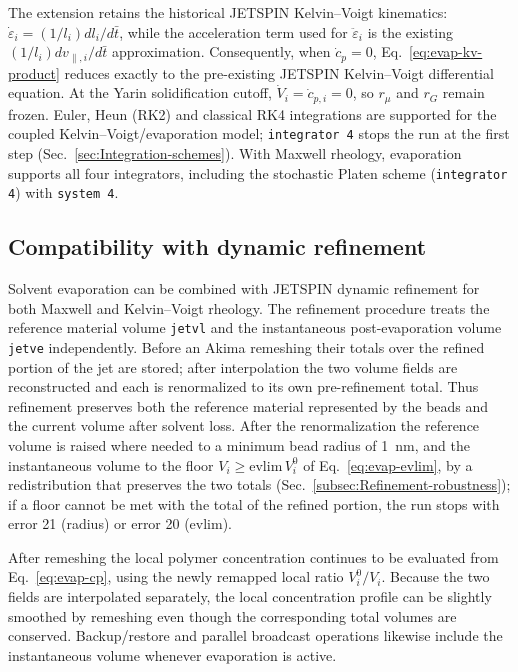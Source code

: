 The extension retains the historical JETSPIN Kelvin--Voigt kinematics:
$\dot\varepsilon_i=(1/l_i)dl_i/d\bar t$, while the acceleration term
used for $\ddot\varepsilon_i$ is the existing
$(1/l_i)d v_{\parallel,i}/d\bar t$ approximation.  Consequently, when
$\dot c_p=0$, Eq.~\ref{eq:evap-kv-product} reduces exactly to the
pre-existing JETSPIN Kelvin--Voigt differential equation.  At the Yarin
solidification cutoff, $\dot V_i=\dot c_{p,i}=0$, so $r_\mu$ and $r_G$
remain frozen.  Euler, Heun (RK2) and classical RK4 integrations are
supported for the coupled Kelvin--Voigt/evaporation model; \texttt{integrator 4}
stops the run at the first step (Sec.~\ref{sec:Integration-schemes}).
With Maxwell rheology, evaporation supports all four integrators,
including the stochastic Platen scheme (\texttt{integrator 4}) with
\texttt{system 4}.

\subsection{Compatibility with dynamic refinement}

Solvent evaporation can be combined with JETSPIN dynamic refinement for
both Maxwell and Kelvin--Voigt rheology.  The refinement procedure treats
the reference material volume \texttt{jetvl} and the instantaneous
post-evaporation volume \texttt{jetve} independently.  Before an Akima
remeshing their totals over the refined portion of the jet are stored;
after interpolation the two volume fields are reconstructed and each is
renormalized to its own pre-refinement total.  Thus refinement preserves
both the reference material represented by the beads and the current
volume after solvent loss.  After the renormalization the reference
volume is raised where needed to a minimum bead radius of 1~nm, and the
instantaneous volume to the floor $V_i\geq\mathrm{evlim}\,V_i^0$ of
Eq.~\ref{eq:evap-evlim}, by a redistribution that preserves the two
totals (Sec.~\ref{subsec:Refinement-robustness}); if a floor cannot
be met with the total of the refined portion, the run stops with error
21 (radius) or error 20 (evlim).

After remeshing the local polymer concentration continues to be evaluated
from Eq.~\ref{eq:evap-cp}, using the newly remapped local ratio
$V_i^0/V_i$.  Because the two fields are interpolated separately, the
local concentration profile can be slightly smoothed by remeshing even
though the corresponding total volumes are conserved.  Backup/restore
and parallel broadcast operations likewise include the instantaneous
volume whenever evaporation is active.

